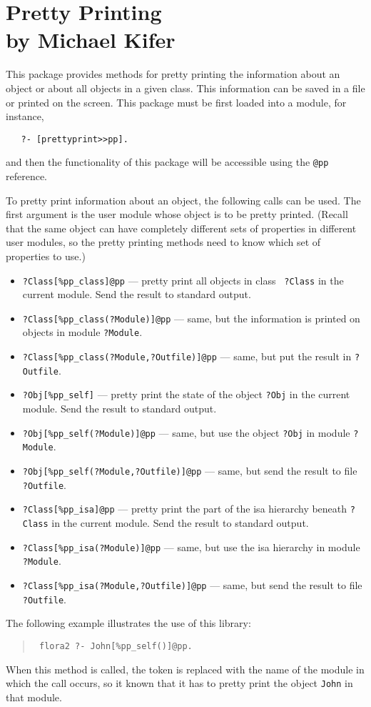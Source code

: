\chapter[Pretty Printing]{Pretty Printing\\{by Michael Kifer}}


This package provides methods for pretty printing the information about an
object or about all objects in a given class. This information can be saved
in a file or printed on the screen. This package must be first loaded into
a module, for instance, 
\begin{verbatim}
   ?- [prettyprint>>pp].
\end{verbatim}
and then the functionality of this package will be
accessible using the {\tt @pp} reference.

To pretty print information about an object, the following calls can be
used.  The first argument is the user module whose object is to be pretty
printed. (Recall that the same object can have completely different sets of
properties in different user modules, so the pretty printing methods need to
know which set of properties to use.)
\begin{itemize}
\item {\tt ?Class[\%pp\_class]@pp} --- pretty print all objects in class {\tt
  ?Class} in the current module. Send the result to standard output.
\item {\tt ?Class[\%pp\_class(?Module)]@pp} --- same, but the information is
  printed on objects in module {\tt ?Module}. 
\item  {\tt ?Class[\%pp\_class(?Module,?Outfile)]@pp} --- same, but
  put the result in {\tt ?Outfile}.
\item {\tt ?Obj[\%pp\_self]} --- pretty print the state of the object {\tt ?Obj}
  in the current module. Send the result to standard output.
\item {\tt ?Obj[\%pp\_self(?Module)]@pp} --- same, but use the object {\tt ?Obj}
  in module {\tt ?Module}.  
\item {\tt ?Obj[\%pp\_self(?Module,?Outfile)]@pp} --- same, but send the result 
  to file {\tt ?Outfile}. 
\item {\tt ?Class[\%pp\_isa]@pp} --- pretty print the part of the isa
  hierarchy beneath {\tt ?Class} in the current module. Send the result to
  standard output.
\item {\tt ?Class[\%pp\_isa(?Module)]@pp} --- same, but use the isa hierarchy in
  module {\tt ?Module}. 
\item {\tt ?Class[\%pp\_isa(?Module,?Outfile)]@pp} --- same, but send the result
  to file {\tt ?Outfile}.
\end{itemize}
The following example illustrates the use of this library:
\begin{quote}
 {\tt
  flora2 ?- John[\%pp\_self(\thismodule)]@pp.
   }
\end{quote}
When this method is called, the token \thismodule is replaced with the name
of the module in which the call occurs, so it known that it has to pretty
print the object {\tt John} in that module.



